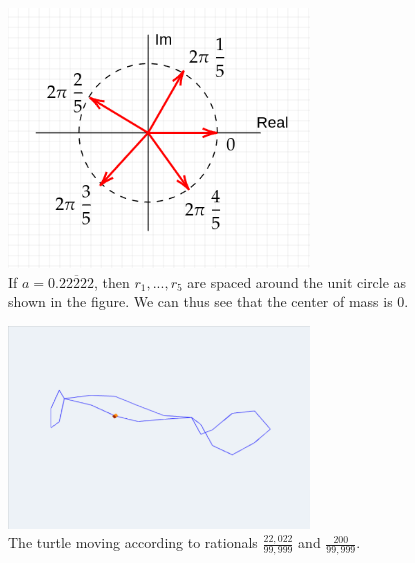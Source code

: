 \documentclass[11pt,titlepage]{article}
\begin{document}
\begin{figure}[h!]
  \centering
  \includegraphics[width=8cm]{fig/evenspacing.png}
  \caption{If $a = 0.\overline{22222}$, then $r_1, ..., r_5$ are spaced around the unit circle as shown in the figure. We can thus
  see that the center of mass is 0.}
  
\end{figure}

\begin{figure}[h!]
  \centering
  \includegraphics[width=8cm]{fig/3DTurtleCenterOfMass.png}
  \caption{The turtle moving according to rationals $\frac{22,022}{99,999}$ and $\frac{200}{99,999}$.}
\end{figure}


\pagebreak
\end{document}
